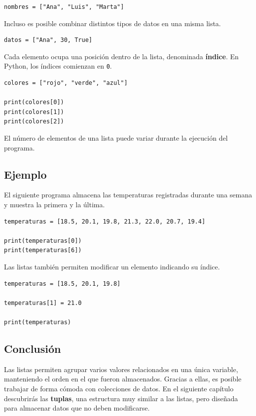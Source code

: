 \documentclass[11pt,a5paper,twoside]{book}
\begin{document}
\begin{tcolorbox}
\scriptsize
 \begin{verbatim}
nombres = ["Ana", "Luis", "Marta"]
\end{verbatim}
\end{tcolorbox}
Incluso es posible combinar distintos tipos de datos en una misma lista.


\begin{tcolorbox}
\scriptsize
 \begin{verbatim}
datos = ["Ana", 30, True]
\end{verbatim}
\end{tcolorbox}
Cada elemento ocupa una posición dentro de la lista, denominada \textbf{índice}. En Python, los índices comienzan en {\scriptsize \texttt{0}}.


\begin{tcolorbox}
\scriptsize
 \begin{verbatim}
colores = ["rojo", "verde", "azul"]

print(colores[0])
print(colores[1])
print(colores[2])
\end{verbatim}
\end{tcolorbox}
El número de elementos de una lista puede variar durante la ejecución del programa.
\subsection{Ejemplo}
El siguiente programa almacena las temperaturas registradas durante una semana y muestra la primera y la última.


\begin{tcolorbox}
\scriptsize
 \begin{verbatim}
temperaturas = [18.5, 20.1, 19.8, 21.3, 22.0, 20.7, 19.4]

print(temperaturas[0])
print(temperaturas[6])
\end{verbatim}
\end{tcolorbox}
Las listas también permiten modificar un elemento indicando su índice.


\begin{tcolorbox}
\scriptsize
 \begin{verbatim}
temperaturas = [18.5, 20.1, 19.8]

temperaturas[1] = 21.0

print(temperaturas)
\end{verbatim}
\end{tcolorbox}
\subsection{Conclusión}
Las listas permiten agrupar varios valores relacionados en una única variable, manteniendo el orden en el que fueron almacenados. Gracias a ellas, es posible trabajar de forma cómoda con colecciones de datos.
En el siguiente capítulo descubrirás las \textbf{tuplas}, una estructura muy similar a las listas, pero diseñada para almacenar datos que no deben modificarse.
\end{document}
